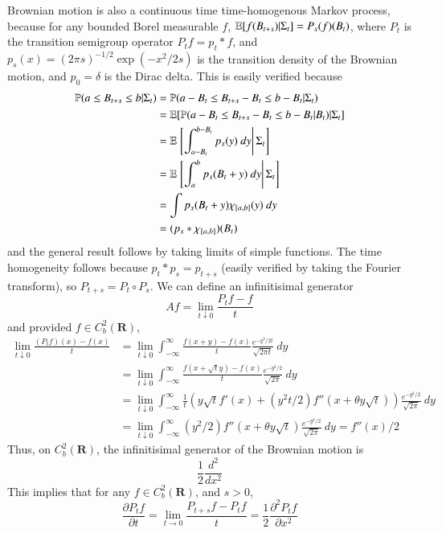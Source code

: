 Brownian motion is also a continuous time time-homogenous Markov process, because for any bounded Borel measurable $f$, $\operatorname{\mathbb{E}}[f(B_{t+s}) | \Sigma_t] = P_s(f)(B_t)$, where $P_t$ is the transition semigroup operator $P_t f = p_t * f$, and $p_s(x) = (2 \pi s)^{-1/2} \exp(-x^2/2s)$ is the transition density of the Brownian motion, and $p_0 = \delta$ is the Dirac delta. This is easily verified because
%
\begin{align*}
    \operatorname{\mathbb{P}}(a \leq B_{t+s} \leq b | \Sigma_t) &= \operatorname{\mathbb{P}}(a - B_t \leq B_{t+s} - B_t \leq b - B_t | \Sigma_t)\\
    &= \operatorname{\mathbb{E}}[\operatorname{\mathbb{P}}(a - B_t \leq B_{t+s} - B_t \leq b - B_t | B_t) | \Sigma_t]\\
    &= \operatorname{\mathbb{E}} \left. \left[ \int_{a - B_t}^{b - B_t} p_s(y)\ dy \right| \Sigma_t \right]\\
    &= \operatorname{\mathbb{E}} \left. \left[ \int_a^b p_s(B_t + y)\ dy \right| \Sigma_t \right]\\
    &= \int p_s(B_t + y) \chi_{[a,b]}(y)\ dy\\
    &= (p_s * \chi_{[a,b]})(B_t)
\end{align*}
%
and the general result follows by taking limits of simple functions. The time homogeneity follows because $p_t * p_s = p_{t+s}$ (easily verified by taking the Fourier transform), so $P_{t+s} = P_t \circ P_s$. We can define an infinitisimal generator
%
\[ Af = \lim_{t \downarrow 0} \frac{P_tf - f}{t} \]
%
and provided $f \in C_b^2(\mathbf{R})$,
%
\begin{align*}
    \lim_{t \downarrow 0} \frac{(P_tf)(x) - f(x)}{t} &= \lim_{t \downarrow 0} \int_{-\infty}^\infty \frac{f(x + y) - f(x)}{t} \frac{e^{-y^2/2t}}{\sqrt{2\pi t}}\ dy\\
    &= \lim_{t \downarrow 0} \int_{-\infty}^\infty \frac{f(x + \sqrt{t}y) - f(x)}{t} \frac{e^{-y^2/2}}{\sqrt{2\pi}}\ dy\\
    &= \lim_{t \downarrow 0} \int_{-\infty}^\infty \frac{1}{t} \left( y \sqrt{t} f'(x) + (y^2t/2) f''(x + \theta y \sqrt{t}) \right) \frac{e^{-y^2/2}}{\sqrt{2\pi}}\ dy\\
    &= \lim_{t \downarrow 0} \int_{-\infty}^\infty (y^2/2) f''(x + \theta y \sqrt{t}) \frac{e^{-y^2/2}}{\sqrt{2\pi}}\ dy = f''(x)/2
\end{align*}
%
Thus, on $C_b^2(\mathbf{R})$, the infinitisimal generator of the Brownian motion is
%
\[ \frac{1}{2} \frac{d^2}{dx^2} \]
%
This implies that for any $f \in C_b^2(\mathbf{R})$, and $s > 0$,
%
\[ \frac{ \partial P_tf}{\partial t} = \lim_{t \to 0} \frac{P_{t+s}f - P_tf}{t} = \frac{1}{2} \frac{\partial^2 P_t f}{\partial x^2} \]
